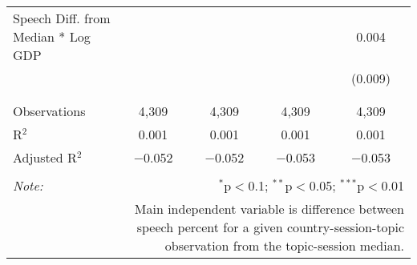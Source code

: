 \begin{table}[!htbp]
\begin{tabular}{@{\extracolsep{5pt}}lcccc}
 Speech Diff. from Median * Log GDP &  &  &  & 0.004 \\ 
  &  &  &  & (0.009) \\ 
  & & & & \\ 
\hline \\[-1.8ex] 
Observations & 4,309 & 4,309 & 4,309 & 4,309 \\ 
R$^{2}$ & 0.001 & 0.001 & 0.001 & 0.001 \\ 
Adjusted R$^{2}$ & $-$0.052 & $-$0.052 & $-$0.053 & $-$0.053 \\ 
\hline 
\hline \\[-1.8ex] 
\textit{Note:}  & \multicolumn{4}{r}{$^{*}$p$<$0.1; $^{**}$p$<$0.05; $^{***}$p$<$0.01} \\ 
 & \multicolumn{4}{r}{Main independent variable is difference between speech percent for a given country-session-topic observation from the topic-session median.} \\ 
\end{tabular} 
\end{table} 
